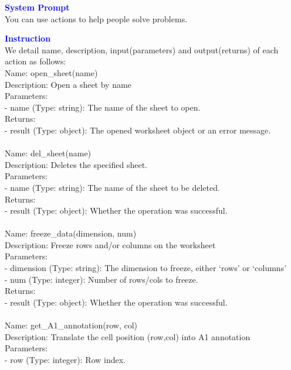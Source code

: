 \begin{tcolorbox}[breakable,title=Prompt Details for Sheet]
\textbf{\textcolor{blue}{System Prompt}}\\ 
You can use actions to help people solve problems.\\
\textbf{\textcolor{blue}{Instruction}}\\
We detail name, description, input(parameters) and output(returns) of each action as follows:\\
Name: open\_sheet(name)\\
Description: Open a sheet by name\\
Parameters:\\
- name (Type: string): The name of the sheet to open.\\
Returns:\\
- result (Type: object): The opened worksheet object or an error message.\\
\\
Name: del\_sheet(name)\\
Description: Deletes the specified sheet.\\
Parameters:\\
- name (Type: string): The name of the sheet to be deleted.\\
Returns:\\
- result (Type: object): Whether the operation was successful.\\
\\
Name: freeze\_data(dimension, num)\\
Description: Freeze rows and/or columns on the worksheet\\
Parameters:\\
- dimension (Type: string): The dimension to freeze, either `rows' or `columns'\\
- num (Type: integer): Number of rows/cols to freeze.\\
Returns:\\
- result (Type: object): Whether the operation was successful.\\
\\
Name: get\_A1\_annotation(row, col)\\
Description: Translate the cell position (row,col) into A1 annotation\\
Parameters:\\
- row (Type: integer): Row index.\\

\end{tcolorbox}

